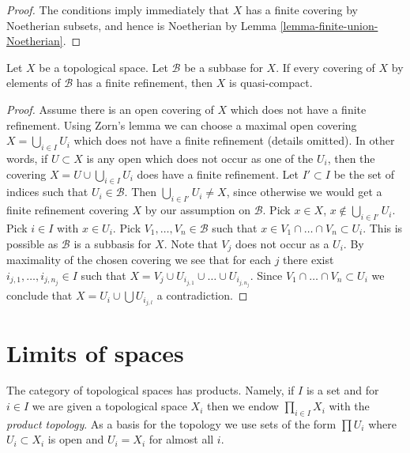 \begin{proof}
The conditions imply immediately that $X$ has a finite covering by
Noetherian subsets, and hence is Noetherian by
Lemma \ref{lemma-finite-union-Noetherian}.
\end{proof}

\begin{lemma}
\label{lemma-subbase-theorem}
Let $X$ be a topological space. Let $\mathcal{B}$ be a subbase for $X$.
If every covering of $X$ by elements of $\mathcal{B}$ has a finite
refinement, then $X$ is quasi-compact.
\end{lemma}

\begin{proof}
Assume there is an open covering of $X$ which does not have a finite
refinement. Using Zorn's lemma we can choose a maximal open covering
$X = \bigcup_{i \in I} U_i$ which does not have a finite refinement
(details omitted).
In other words, if $U \subset X$ is any open which does not occur as
one of the $U_i$, then the covering $X = U \cup \bigcup_{i \in I} U_i$
does have a finite refinement. Let $I' \subset I$ be the set of indices
such that $U_i \in \mathcal{B}$. Then $\bigcup_{i \in I'} U_i \not = X$,
since otherwise we would get a finite refinement covering $X$ by our
assumption on $\mathcal{B}$. Pick $x \in X$,
$x \not \in \bigcup_{i \in I'} U_i$. Pick $i \in I$ with $x \in U_i$.
Pick $V_1, \ldots, V_n \in \mathcal{B}$ such that
$x \in V_1 \cap \ldots \cap V_n \subset U_i$. This is
possible as $\mathcal{B}$ is a subbasis for $X$. Note that
$V_j$ does not occur as a $U_i$. By maximality of the chosen
covering we see that for each $j$ there exist
$i_{j, 1}, \ldots, i_{j, n_j} \in I$ such that
$X = V_j \cup U_{i_{j, 1}} \cup \ldots \cup U_{i_{j, n_j}}$.
Since $V_1 \cap \ldots \cap V_n \subset U_i$ we conclude that
$X = U_i \cup \bigcup U_{i_{j, l}}$ a contradiction.
\end{proof}





\section{Limits of spaces}
\label{section-limits}

\noindent
The category of topological spaces has products. Namely, if $I$ is a set
and for $i \in I$ we are given a topological space $X_i$ then we endow
$\prod_{i \in I} X_i$ with the {\it product topology}. As a basis for
the topology we use sets of the form $\prod U_i$ where $U_i \subset X_i$
is open and $U_i = X_i$ for almost all $i$.

